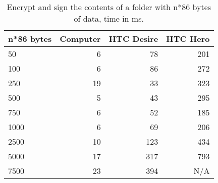 \begin{table}
  \centering
  \caption{Encrypt and sign the contents of a folder with n*86 bytes of data, time in ms.}
  \begin{tabular}{ | l | r | r | r |}
    \hline
    \textbf{n*86 bytes} & \textbf{Computer} & \textbf{HTC Desire} & \textbf{HTC Hero} \\ \hline
    50      &6  &78     &201    \\ \hline
    100     &6  &86     &272    \\ \hline
    250     &19 &33     &323    \\ \hline   
    500     &5  &43     &295    \\ \hline
    750     &6  &52     &185    \\ \hline
    1000    &6  &69     &206    \\ \hline
    2500    &10 &123    &434    \\ \hline     
    5000    &17 &317    &793    \\ \hline 
    7500    &23 &394    &N/A    \\ \hline 
  \end{tabular}
  \label{tbl:folder:encryptsign}
\end{table}

